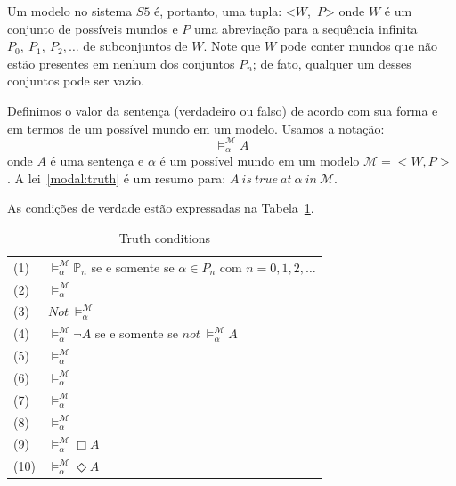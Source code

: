 Um modelo no sistema $S5$ é, portanto, uma tupla:
<$W$,~$P$>
onde $W$ é um conjunto de possíveis mundos e $P$ uma abreviação para a sequência
infinita 
$P_0,\ P_1,\ P_2,\ldots$
de subconjuntos de $W$.
Note que $W$ pode conter mundos que não estão presentes em nenhum dos conjuntos
$P_n$; de fato, qualquer um desses conjuntos pode ser vazio.

Definimos o valor da sentença (verdadeiro ou falso) de acordo com sua forma e em
termos de um possível mundo em um modelo.
Usamos a notação:
\begin{equation}
    \label{modal:truth}
    \models ^{\mathcal{M}}_{\alpha} A 
\end{equation}
onde $A$ é uma sentença e $\alpha$ é um possível mundo em um modelo
$\mathcal{M}=<W,P>$.
A lei~\ref{modal:truth} é um resumo para: $A\ is\ true\ at\ \alpha\ in\
\mathcal{M}$.

As condições de verdade estão expressadas na Tabela~\ref{table:truth}.

\begin{center}
    \begin{table}[h!]
\label{table:truth}
    \caption{Truth conditions}

    \begin{tabular}{ll}

        \vspace{2mm}
        (1) & $\models ^{\mathcal{M}}_{\alpha} \mathbb{P}_n$ se e somente se $\alpha \in
        P_n$ com $n=0,1,2,\ldots$\\
        \vspace{2mm}
        (2)  & $\models ^{\mathcal{M}}_{\alpha} $\\
        \vspace{2mm}
        (3)  & $Not\ \models ^{\mathcal{M}}_{\alpha} $\\
        \vspace{2mm}
        (4)  & $\models ^{\mathcal{M}}_{\alpha} \neg A$ se e somente se $not\
        \models ^{\mathcal{M}}_{\alpha} A$\\
        \vspace{2mm}
        (5)  & $\models ^{\mathcal{M}}_{\alpha} $\\
        \vspace{2mm}
        (6)  & $\models ^{\mathcal{M}}_{\alpha} $\\
        \vspace{2mm}
        (7)  & $\models ^{\mathcal{M}}_{\alpha} $\\
        \vspace{2mm}
        (8)  & $\models ^{\mathcal{M}}_{\alpha} $\\
        \vspace{2mm}
        (9)  & $\models ^{\mathcal{M}}_{\alpha} \Box A $\\
        \vspace{2mm}
        (10) & $\models ^{\mathcal{M}}_{\alpha} \Diamond A $\\

    \end{tabular}
\end{table}
\end{center}

